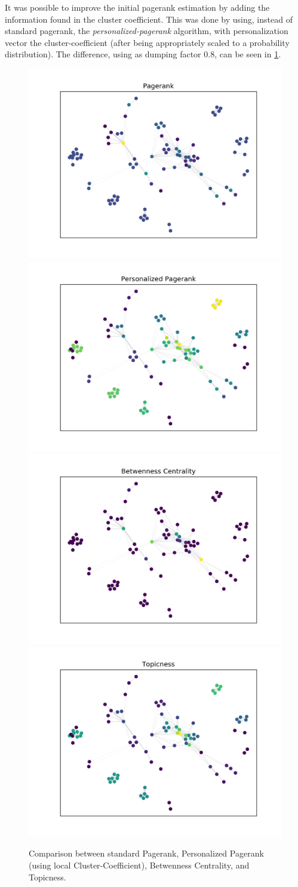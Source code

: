 It was possible to improve the initial pagerank estimation by adding the information found in the cluster coefficient. This was done by using, instead of standard pagerank, the \textit{personalized-pagerank} algorithm, with personalization vector the cluster-coefficient (after being appropriately scaled to a probability distribution).
The difference, using as dumping factor $0.8$, can be seen in \cref{fig:pagerank_comparison}.
\begin{figure}[h!]
		\centering
		\includegraphics[width=.495\textwidth]{img/pr.png}
		\includegraphics[width=.495\textwidth]{img/ppr.png}\\
		\includegraphics[width=.495\textwidth]{img/bc.png}
		\includegraphics[width=.495\textwidth]{img/tp.png}
		\caption{Comparison between standard Pagerank, Personalized Pagerank (using local Cluster-Coefficient), Betwenness Centrality, and Topicness.}
		\label{fig:pagerank_comparison}
\end{figure}
